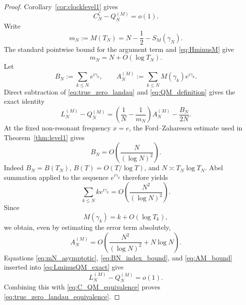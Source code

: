 \documentclass[11pt]{amsart}
\numberwithin{equation}{section}
\theoremstyle{definition}
\theoremstyle{remark}
\begin{document}
\begin{proof}
Corollary~\ref{cor:clocklevel1} gives
\begin{equation}\label{eq:C_QM_equivalence}
C_N^{\zeta}-Q_N^{(M)}=o(1).
\end{equation}
Write
\begin{equation}\label{eq:mN_definition}
m_N:=M(T_N)=N-\frac12-S_M(\gamma_N).
\end{equation}
The standard pointwise bound for the argument term and \eqref{eq:HminusM} give
\begin{equation}\label{eq:mN_asymptotic}
m_N=N+O(\log T_N).
\end{equation}
Let
\begin{equation}\label{eq:BN_AM_definitions}
B_N:=\sum_{k\leq N}e^{i\gamma_k},
\qquad
A_N^{(M)}:=\sum_{k\leq N}M(\gamma_k)e^{i\gamma_k}.
\end{equation}
Direct subtraction of \eqref{eq:true_zero_landau} and \eqref{eq:QM_definition} gives the exact identity
\begin{equation}\label{eq:LminusQM_exact}
L_N^{(M)}-Q_N^{(M)}
=\left(\frac1N-\frac1{m_N}\right)A_N^{(M)}
-\frac{B_N}{2N}.
\end{equation}
At the fixed non-resonant frequency $x=e$, the Ford--Zaharescu estimate used in Theorem~\ref{thm:level1} gives
\begin{equation}\label{eq:BN_index_bound}
B_N=O\!\left(\frac{N}{(\log N)^2}\right).
\end{equation}
Indeed $B_N=B(T_N)$, $B(T)=O(T/\log T)$, and $N\asymp T_N\log T_N$.  Abel summation applied to the sequence $e^{i\gamma_k}$ therefore yields
\begin{equation}\label{eq:k_phase_bound}
\sum_{k\leq N}k e^{i\gamma_k}
=O\!\left(\frac{N^2}{(\log N)^2}\right).
\end{equation}
Since
\begin{equation}\label{eq:M_gamma_k_rank}
M(\gamma_k)=k+O(\log T_k),
\end{equation}
we obtain, even by estimating the error term absolutely,
\begin{equation}\label{eq:AM_bound}
A_N^{(M)}
=O\!\left(\frac{N^2}{(\log N)^2}+N\log N\right).
\end{equation}
Equations \eqref{eq:mN_asymptotic}, \eqref{eq:BN_index_bound}, and \eqref{eq:AM_bound} inserted into \eqref{eq:LminusQM_exact} give
\begin{equation}\label{eq:LminusQM_o1}
L_N^{(M)}-Q_N^{(M)}=o(1).
\end{equation}
Combining this with \eqref{eq:C_QM_equivalence} proves \eqref{eq:true_zero_landau_equivalence}.
\end{proof}
\end{document}
